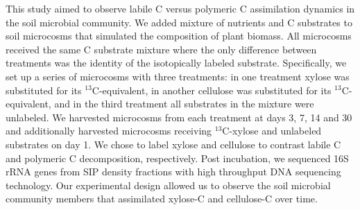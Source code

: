 This study aimed to observe labile C versus polymeric C assimilation dynamics
in the soil microbial community. We added mixture of nutrients and
C substrates to soil microcosms that simulated the composition of plant
biomass. All microcosms received the same C substrate mixture where the only
difference between treatments was the identity of the isotopically
labeled substrate. Specifically, we set up a series of microcosms with three
treatments: in one treatment xylose was substituted for its
$^{13}$C-equivalent, in another cellulose was substituted for its
$^{13}$C-equivalent, and in the third treatment all substrates in the mixture
were unlabeled. We harvested microcosms from each treatment at days 3, 7, 14
and 30 and additionally harvested microcosms receiving $^{13}$C-xylose and
unlabeled substrates on day 1. We chose to label xylose and cellulose to
contrast labile C and polymeric C decomposition, respectively. Post incubation,
we sequenced 16S rRNA genes from SIP density fractions with high throughput DNA
sequencing technology. Our experimental design allowed us to observe the soil
microbial community members that assimilated xylose-C and cellulose-C over
time.
